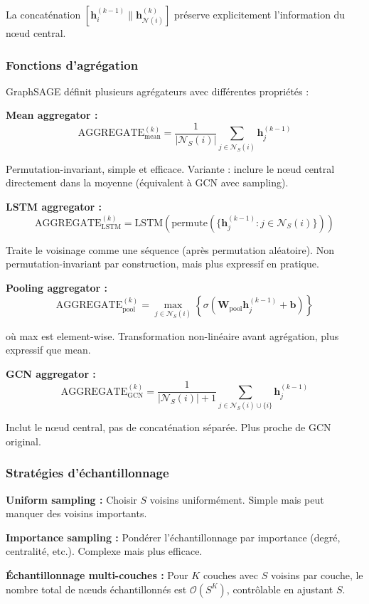 La concaténation $[\mathbf{h}_i^{(k-1)} \| \mathbf{h}_{\mathcal{N}(i)}^{(k)}]$ préserve explicitement l'information du nœud central.

\subsubsection{Fonctions d'agrégation}

GraphSAGE définit plusieurs agrégateurs avec différentes propriétés :

\textbf{Mean aggregator :}
\[
\text{AGGREGATE}_{\text{mean}}^{(k)} = \frac{1}{|\mathcal{N}_S(i)|}\sum_{j \in \mathcal{N}_S(i)} \mathbf{h}_j^{(k-1)}
\]

Permutation-invariant, simple et efficace. Variante : inclure le nœud central directement dans la moyenne (équivalent à GCN avec sampling).

\textbf{LSTM aggregator :}
\[
\text{AGGREGATE}_{\text{LSTM}}^{(k)} = \text{LSTM}\left(\text{permute}(\{\mathbf{h}_j^{(k-1)} : j \in \mathcal{N}_S(i)\})\right)
\]

Traite le voisinage comme une séquence (après permutation aléatoire). Non permutation-invariant par construction, mais plus expressif en pratique.

\textbf{Pooling aggregator :}
\[
\text{AGGREGATE}_{\text{pool}}^{(k)} = \max_{j \in \mathcal{N}_S(i)} \left\{\sigma\left(\mathbf{W}_{\text{pool}}\mathbf{h}_j^{(k-1)} + \mathbf{b}\right)\right\}
\]

où max est element-wise. Transformation non-linéaire avant agrégation, plus expressif que mean.

\textbf{GCN aggregator :}
\[
\text{AGGREGATE}_{\text{GCN}}^{(k)} = \frac{1}{|\mathcal{N}_S(i)| + 1}\sum_{j \in \mathcal{N}_S(i) \cup \{i\}} \mathbf{h}_j^{(k-1)}
\]

Inclut le nœud central, pas de concaténation séparée. Plus proche de GCN original.

\subsubsection{Stratégies d'échantillonnage}

\textbf{Uniform sampling :}
Choisir $S$ voisins uniformément. Simple mais peut manquer des voisins importants.

\textbf{Importance sampling :}
Pondérer l'échantillonnage par importance (degré, centralité, etc.). Complexe mais plus efficace.

\textbf{Échantillonnage multi-couches :}
Pour $K$ couches avec $S$ voisins par couche, le nombre total de nœuds échantillonnés est $\mathcal{O}(S^K)$, contrôlable en ajustant $S$.

